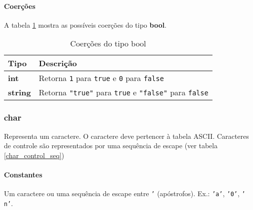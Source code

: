 \paragraph{Coerções} A tabela \ref{tab:coercoes-bool} mostra as possíveis coerções do tipo \textbf{bool}.
\begin{table}[!h]
    \begin{tabular}{@{}ll@{}}
        \toprule
        Tipo            & Descrição                                                                         \\ \midrule
        \textbf{int}    & Retorna \texttt{1} para \texttt{true} e \texttt{0} para \texttt{false}            \\
        \textbf{string} & Retorna \texttt{"true"} para \texttt{true} e \texttt{"false"} para \texttt{false} \\ \bottomrule
    \end{tabular}
    \caption{Coerções do tipo bool}
    \label{tab:coercoes-bool}
\end{table}

\subsubsection{char}
Representa um caractere. O caractere deve pertencer à tabela ASCII. Caracteres de controle são representados por uma sequência de escape (ver tabela \ref{char_control_seq})

\paragraph{Constantes} Um caractere ou uma sequência de escape entre \texttt{'} (apóstrofos). Ex.: \texttt{'a'}, \texttt{'0'}, \texttt{'\\n'}.

